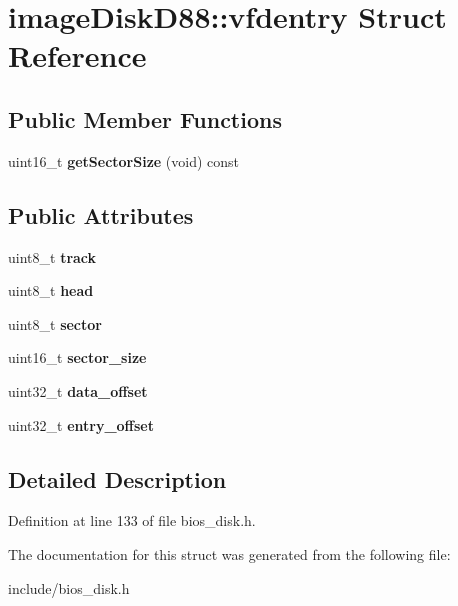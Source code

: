 \hypertarget{structimageDiskD88_1_1vfdentry}{\section{image\-Disk\-D88\-:\-:vfdentry Struct Reference}
\label{structimageDiskD88_1_1vfdentry}
}
\subsection*{Public Member Functions}
\begin{DoxyCompactItemize}
\item 
\hypertarget{structimageDiskD88_1_1vfdentry_a308243cc68ff88697a893f66c99243e5}{uint16\-\_\-t {\bfseries get\-Sector\-Size} (void) const }\label{structimageDiskD88_1_1vfdentry_a308243cc68ff88697a893f66c99243e5}

\end{DoxyCompactItemize}
\subsection*{Public Attributes}
\begin{DoxyCompactItemize}
\item 
\hypertarget{structimageDiskD88_1_1vfdentry_ab6be8861bab810343858d2b3eb2c80cd}{uint8\-\_\-t {\bfseries track}}\label{structimageDiskD88_1_1vfdentry_ab6be8861bab810343858d2b3eb2c80cd}

\item 
\hypertarget{structimageDiskD88_1_1vfdentry_a9d77966ce846181817e786de4c17f005}{uint8\-\_\-t {\bfseries head}}\label{structimageDiskD88_1_1vfdentry_a9d77966ce846181817e786de4c17f005}

\item 
\hypertarget{structimageDiskD88_1_1vfdentry_acca39005f709d218d88f31f7f4622cb4}{uint8\-\_\-t {\bfseries sector}}\label{structimageDiskD88_1_1vfdentry_acca39005f709d218d88f31f7f4622cb4}

\item 
\hypertarget{structimageDiskD88_1_1vfdentry_a38d94595d696210f20897f239fa39e44}{uint16\-\_\-t {\bfseries sector\-\_\-size}}\label{structimageDiskD88_1_1vfdentry_a38d94595d696210f20897f239fa39e44}

\item 
\hypertarget{structimageDiskD88_1_1vfdentry_a39b1b5ef8922b2b16a63d207b155d49c}{uint32\-\_\-t {\bfseries data\-\_\-offset}}\label{structimageDiskD88_1_1vfdentry_a39b1b5ef8922b2b16a63d207b155d49c}

\item 
\hypertarget{structimageDiskD88_1_1vfdentry_aa58f7c17c694ab100aa242aa90b45868}{uint32\-\_\-t {\bfseries entry\-\_\-offset}}\label{structimageDiskD88_1_1vfdentry_aa58f7c17c694ab100aa242aa90b45868}

\end{DoxyCompactItemize}


\subsection{Detailed Description}


Definition at line 133 of file bios\-\_\-disk.\-h.



The documentation for this struct was generated from the following file\-:\begin{DoxyCompactItemize}
\item 
include/bios\-\_\-disk.\-h\end{DoxyCompactItemize}

